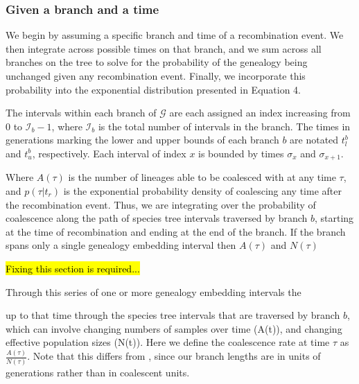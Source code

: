 \documentclass[11pt]{article}
\begin{document}
\subsubsection{Given a branch and a time}
We begin by assuming a specific branch and time of a recombination event. We then 
integrate across possible times on that branch, and we sum across all branches on
the tree to solve for the probability of the genealogy being unchanged given any 
recombination event. Finally, we incorporate this probability into the exponential
distribution presented in Equation 4.

The intervals within each branch of $\mathcal{G}$ are each assigned an index increasing from $0$ to $\mathcal{I}_b-1$, where $\mathcal{I}_b$ is 
the total number of intervals in the branch. The times in generations marking the lower and upper bounds of each branch $b$ are notated $t_l^b$ and $t_u^b$, 
respectively. Each interval of index $x$ is bounded by times $\sigma_x$ and $\sigma_{x+1}$.

Where $A(\tau)$ is the number of lineages able to be coalesced with at any time $\tau$, 
and $p(\tau|t_r)$ is the exponential probability density of coalescing any time 
after the recombination event. Thus, we are integrating over the probability
of coalescence along the path of species tree intervals traversed
by branch $b$, starting at the time of recombination and ending at the 
end of the branch. If the branch spans only a single genealogy embedding 
interval then $A(\tau)$ and $N(\tau)$

\hl{Fixing this section is required...}

Through this series of one or more genealogy embedding intervals the 

up to that time through the species tree intervals that are traversed
by branch $b$, which can involve changing numbers of samples over time (A(t)), 
and changing effective population sizes (N(t)).
Here we define the coalescence rate at time $\tau$ as $\frac{A(\tau)}{N(\tau)}$. 
Note that this differs from \citet{deng_distribution_2021}, 
since our branch lengths are in units of generations rather than in
coalescent units. 

\end{document}
